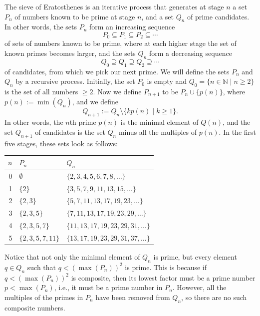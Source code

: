 The sieve of Eratosthenes is an iterative process that generates at stage $n$ a set $P_n$ of numbers known to be prime at stage $n$, and a set $Q_n$ of prime candidates. In other words, the sets $P_n$ form an increasing sequence
\begin{equation*}
  P_0\subseteq P_1\subseteq P_2 \subseteq \cdots
\end{equation*}
of sets of numbers known to be prime, where at each higher stage the set of known primes becomes larger, and the sets $Q_n$ form a decreasing sequence
\begin{equation*}
  Q_0\supseteq Q_1 \supseteq Q_2 \supseteq \cdots
\end{equation*}
of candidates, from which we pick our next prime. We will define the sets $P_n$ and $Q_n$ by a recursive process. Initially, the set $P_0$ is empty and $Q_0=\{n\in\mathbb{N}\mid n\geq 2\}$ is the set of all numbers $\geq 2$. Now we define $P_{n+1}$ to be $P_n\cup \{p(n)\}$, where $p(n):=\min(Q_n)$, and we define
\begin{equation*}
  Q_{n+1}:=Q_n\setminus \{kp(n)\mid k\geq 1\}.
\end{equation*}
In other words, the $n$th prime $p(n)$ is the minimal element of $Q(n)$, and the set $Q_{n+1}$ of candidates is the set $Q_n$ minus all the multiples of $p(n)$. In the first five stages, these sets look as follows:

\begin{center}
  \renewcommand{\arraystretch}{1.2} %
  \setlength{\tabcolsep}{10pt}      %
  \begin{tabular}{r|l l}
    \textbf{$n$} & \textbf{$P_n$} & \textbf{$Q_n$} \\ \hline
    0 & $\emptyset$ & $\{2,3,4,5,6,7,8,\ldots\}$ \\
    1 & $\{2\}$ & $\{3,5,7,9,11,13,15,\ldots\}$ \\
    2 & $\{2,3\}$ & $\{5,7,11,13,17,19,23,\ldots\}$ \\
    3 & $\{2,3,5\}$ & $\{7,11,13,17,19,23,29,\ldots\}$ \\
    4 & $\{2,3,5,7\}$ & $\{11,13,17,19,23,29,31,\ldots\}$ \\
    5 & $\{2,3,5,7,11\}$ & $\{13,17,19,23,29,31,37,\ldots\}$ \\
  \end{tabular}
\end{center}

Notice that not only the minimal element of $Q_n$ is prime, but every element $q\in Q_n$ such that $q<(\max(P_n))^2$ is prime. This is because if $q<(\max(P_n))^2$ is composite, then its lowest factor must be a prime number $p<\max(P_n)$, i.e., it must be a prime number in $P_n$. However, all the multiples of the primes in $P_n$ have been removed from $Q_n$, so there are no such composite numbers.

